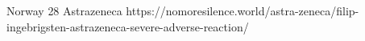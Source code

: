           {
            Norway
          }
          {
            28
          }
          {
            Astrazeneca
          }
          {
          }
          {
          }
          {
            https://nomoresilence.world/astra-zeneca/filip-ingebrigsten-astrazeneca-severe-adverse-reaction/
          }

